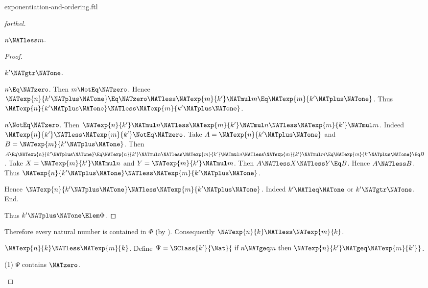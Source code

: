 \documentclass{stex}
\begin{document}
\begin{smodule}{exponentiation-and-ordering.ftl}
\begin{proof}[forthel]
\begin{case}{$n \NATless m$.}
\begin{proof}
        \begin{case}{$k' \NATgtr \NATone$.}
          \begin{case}{$n \Eq \NATzero$.}
            Then $m \NotEq \NATzero$.
            Hence $\NATexp{n}{k' \NATplus \NATone}
              \Eq \NATzero
              \NATless \NATexp{m}{k'} \NATmul m
              \Eq \NATexp{m}{k' \NATplus \NATone}$.
            Thus $\NATexp{n}{k' \NATplus \NATone} \NATless \NATexp{m}{k' \NATplus \NATone}$.
          \end{case}

          \begin{case}{$n \NotEq \NATzero$.}
            Then $\NATexp{n}{k'} \NATmul n
              \NATless \NATexp{m}{k'} \NATmul n
              \NATless \NATexp{m}{k'} \NATmul m$.
            Indeed $\NATexp{n}{k'} \NATless \NATexp{m}{k'} \NotEq \NATzero$.
            Take $A = \NATexp{n}{k' \NATplus \NATone}$ and $B = \NATexp{m}{k' \NATplus \NATone}$. %
            Then $A
              \Eq \NATexp{n}{k' \NATplus \NATone}
              \Eq \NATexp{n}{k'} \NATmul n
              \NATless \NATexp{m}{k'} \NATmul n
              \NATless \NATexp{m}{k'} \NATmul m
              \Eq \NATexp{m}{k' \NATplus \NATone}
              \Eq B$.
            Take $X = \NATexp{m}{k'} \NATmul n$ and $Y = \NATexp{m}{k'} \NATmul m$.
            Then $A \NATless X \NATless Y \Eq B$.
            Hence $A \NATless B$.
            Thus $\NATexp{n}{k' \NATplus \NATone} \NATless \NATexp{m}{k' \NATplus \NATone}$.
          \end{case}
        \end{case}

        Hence $\NATexp{n}{k' \NATplus \NATone} \NATless \NATexp{m}{k' \NATplus \NATone}$.
        Indeed $k' \NATleq \NATone$ or $k' \NATgtr \NATone$.
      End.

      Thus $k' \NATplus \NATone \Elem \Phi$.
    \end{proof}

    Therefore every natural number is contained in $\Phi$ (by ).
    Consequently $\NATexp{n}{k} \NATless \NATexp{m}{k}$.
  \end{case}

  \begin{case}{$\NATexp{n}{k} \NATless \NATexp{m}{k}$.}
    Define $\Psi = \SClass{k'}{\Nat}{\text{ if }n \NATgeq m\text{ then }\NATexp{n}{k'} \NATgeq \NATexp{m}{k'}}$.

    (1) $\Psi$ contains $\NATzero$.


\end{case}
\end{proof}
\end{smodule}
\end{document}
